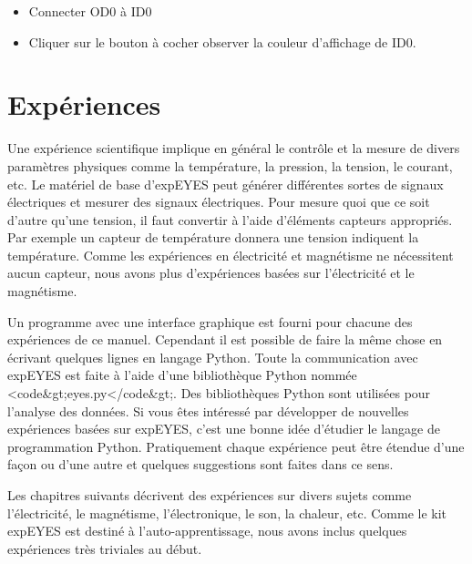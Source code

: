 \documentclass{book}
\begin{document}
\begin{itemize}
  \item Connecter OD0 à ID0
  \item Cliquer sur le bouton à cocher observer la couleur d'affichage de ID0.
\end{itemize}










\section{Expériences}


Une expérience scientifique implique en général le contrôle et la mesure de divers paramètres physiques comme la température, la pression, la tension, le courant, etc. Le matériel de base d'expEYES peut générer différentes sortes de signaux électriques et mesurer des signaux électriques. Pour mesure quoi que ce soit d'autre qu’une tension, il faut convertir à l'aide d'éléments capteurs appropriés. Par exemple un capteur de température donnera une tension indiquent la température. Comme les expériences en électricité et magnétisme ne nécessitent aucun capteur, nous avons plus d'expériences basées sur l'électricité et le magnétisme.



Un programme avec une interface graphique est fourni pour chacune des expériences de ce manuel. Cependant il est possible de faire la même chose en écrivant quelques lignes en langage Python. Toute la communication avec expEYES est faite à l'aide d'une bibliothèque Python nommée <code\&gt;eyes.py</code\&gt;. Des bibliothèques Python sont utilisées pour l'analyse des données. Si vous êtes intéressé par développer de nouvelles expériences basées sur expEYES, c'est une bonne idée d'étudier le langage de programmation Python. Pratiquement chaque expérience peut être étendue d'une façon ou d'une autre et quelques suggestions sont faites dans ce sens.



Les chapitres suivants décrivent des expériences sur divers sujets comme l'électricité, le magnétisme, l'électronique, le son, la chaleur, etc. Comme le kit expEYES est destiné à l'auto-apprentissage, nous avons inclus quelques expériences très triviales au début.



\end{document}
